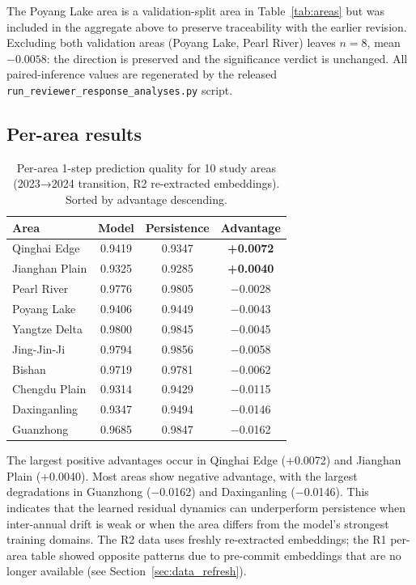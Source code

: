 \documentclass{article}
\begin{document}
The Poyang Lake area is a validation-split area in Table~\ref{tab:areas} but was included in the aggregate above to preserve traceability with the earlier revision. Excluding both validation areas (Poyang Lake, Pearl River) leaves $n=8$, mean $-0.0058$: the direction is preserved and the significance verdict is unchanged. All paired-inference values are regenerated by the released \texttt{run\_reviewer\_response\_analyses.py} script.

\subsection{Per-area results}

\begin{table}[htbp]
\centering
\caption{Per-area 1-step prediction quality for 10 study areas (2023→2024 transition, R2 re-extracted embeddings). Sorted by advantage descending.}
\label{tab:perarea}
\begin{tabular}{lccc}
\toprule
Area & Model & Persistence & Advantage \\
\midrule
Qinghai Edge & 0.9419 & 0.9347 & \textbf{+0.0072} \\
Jianghan Plain & 0.9325 & 0.9285 & \textbf{+0.0040} \\
Pearl River & 0.9776 & 0.9805 & $-$0.0028 \\
Poyang Lake & 0.9406 & 0.9449 & $-$0.0043 \\
Yangtze Delta & 0.9800 & 0.9845 & $-$0.0045 \\
Jing-Jin-Ji & 0.9794 & 0.9856 & $-$0.0058 \\
Bishan & 0.9719 & 0.9781 & $-$0.0062 \\
Chengdu Plain & 0.9314 & 0.9429 & $-$0.0115 \\
Daxinganling & 0.9347 & 0.9494 & $-$0.0146 \\
Guanzhong & 0.9685 & 0.9847 & $-$0.0162 \\
\bottomrule
\end{tabular}
\end{table}

The largest positive advantages occur in Qinghai Edge (+0.0072) and Jianghan Plain (+0.0040). Most areas show negative advantage, with the largest degradations in Guanzhong ($-$0.0162) and Daxinganling ($-$0.0146). This indicates that the learned residual dynamics can underperform persistence when inter-annual drift is weak or when the area differs from the model's strongest training domains. The R2 data uses freshly re-extracted embeddings; the R1 per-area table showed opposite patterns due to pre-commit embeddings that are no longer available (see Section~\ref{sec:data_refresh}).
\end{document}

